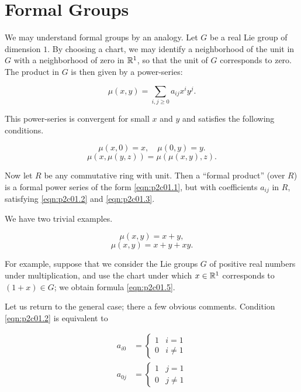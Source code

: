 \documentclass[../main]{subfiles}
\begin{document}
\label{sec:p2c1}

\chapter{Formal Groups}
We may understand formal groups by an analogy. Let $G$ be a real Lie group of dimension $1$. By choosing a chart, we may identify a neighborhood of the unit in $G$ with a neighborhood of zero in ${\mathbb{R}}^1$, so that the unit of $G$ corresponds to zero. The product in $G$ is then given by a power-series:

\begin{equation}
\tag{1.1}
\label{eqn:p2c01.1}
\mu(x, y) = \sum_{i, j \ge 0} a_{ij} x^i y^j.
\end{equation}

This power-series is convergent for small $x$ and $y$ and satisfies the following conditions.

\begin{equation}
\tag{1.2}
\label{eqn:p2c01.2}
\mu(x,0) = x, \quad \mu(0, y) = y.
\end{equation}
\begin{equation}
\tag{1.3}
\label{eqn:p2c01.3}
\mu(x, \mu(y, z)) = \mu(\mu(x, y), z).
\end{equation}

Now let $R$ be any commutative ring with unit. Then a ``formal product'' (over $R$) is a formal power series of the form \eqref{eqn:p2c01.1}, but with coefficients $a_{ij}$ in $R$, satisfying \eqref{eqn:p2c01.2} and \eqref{eqn:p2c01.3}. 

We have two trivial examples.

\begin{equation}
\tag{1.4} 
\label{eqn:p2c01.4}
\mu(x, y) = x + y,
\end{equation}
\begin{equation}
\tag{1.5}
\label{eqn:p2c01.5}
\mu(x, y) = x + y + xy.
\end{equation}

For example, suppose that we consider the Lie groups $G$ of positive real numbers under multiplication, and use the chart under which $x \in {\mathbb{R}}^1$ corresponds to $(1 + x) \in G$; we obtain formula \eqref{eqn:p2c01.5}.

Let us return to the general case; there a few obvious comments. Condition \eqref{eqn:p2c01.2} is equivalent to 

\begin{equation}
\tag{1.6}
\begin{split}
a_{i0} & = \begin{cases}1 & i = 1 \\ 0 & i \ne 1\end{cases} \\
a_{0j} & = \begin{cases}1 & j = 1 \\ 0 & j \ne 1\end{cases}
\end{split}
\end{equation}
\end{document}
